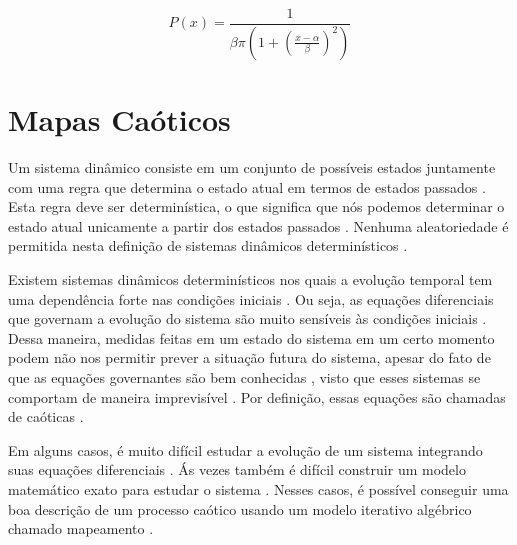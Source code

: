 \begin{equation}
P(x) = \frac{1}{\beta \pi (1 + (\frac{x - \alpha}{\beta})^2)}
\end{equation}

\section{Mapas Caóticos}

Um sistema dinâmico consiste em um conjunto de possíveis estados juntamente com uma regra que determina o estado atual em termos de estados passados \cite{alligood}. Esta regra deve ser determinística, o que significa que nós podemos determinar o estado atual unicamente a partir dos estados passados \cite{alligood}. Nenhuma aleatoriedade é permitida nesta definição de sistemas dinâmicos determinísticos \cite{alligood}.



Existem sistemas dinâmicos determinísticos nos quais a evolução temporal tem uma dependência forte nas condições iniciais \cite{cattani}. Ou seja, as equações diferenciais que governam a evolução do sistema são muito sensíveis às condições iniciais \cite{cattani}. Dessa maneira, medidas feitas em um estado do sistema em um certo momento podem não nos permitir prever a situação futura do sistema, apesar do fato de que as equações governantes são bem conhecidas \cite{cattani}, visto que esses sistemas se comportam de maneira imprevisível \cite{fister}. Por definição, essas equações são chamadas de caóticas \cite{cattani}.

Em alguns casos, é muito difícil estudar a evolução de um sistema integrando suas equações diferenciais \cite{cattani}. Ás vezes também é difícil construir um modelo matemático exato para estudar o sistema \cite{cattani}. Nesses casos, é possível conseguir uma boa descrição de um processo caótico usando um modelo iterativo algébrico chamado mapeamento \cite{cattani}.

